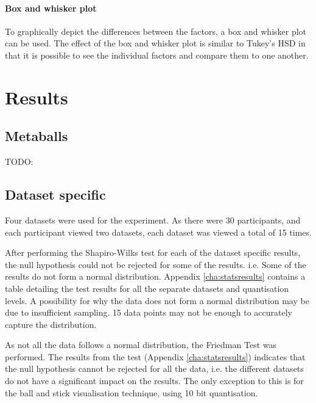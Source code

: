 \paragraph{Box and whisker plot}
To graphically depict the differences between the factors, a box and whisker
plot can be used. The effect of the box and whisker plot is similar to Tukey's
HSD in that it is possible to see the individual factors and compare them to
one another.


\section{Results}
\label{sec:results_results}

\subsection{Metaballs}
\label{sub:results_results_metaballs}

TODO:


\subsection{Dataset specific}
\label{sub:results_results_dataset}

Four datasets were used for the experiment. As there were 30 participants, and
each participant viewed two datasets, each dataset was viewed a total of 15
times.

After performing the Shapiro-Wilks test for each of the dataset specific
results, the null hypothesis could not be rejected for some of the results.
i.e. Some of the results do not form a normal distribution. Appendix
\ref{cha:statsresults} contains a table detailing the test results for all the
separate datasets and quantisation levels. A possibility for why the data does
not form a normal distribution may be due to insufficient sampling. 15 data
points may not be enough to accurately capture the distribution.

As not all the data follows a normal distribution, the Friedman Test was
performed. The results from the test (Appendix \ref{cha:statsresults})
indicates that the null hypothesis cannot be rejected for all the data, i.e.
the different datasets do not have a significant impact on the results. The
only exception to this is for the ball and stick visualisation technique, using
10 bit quantisation.

